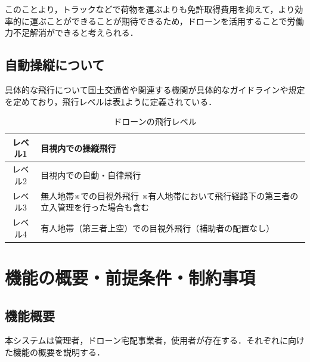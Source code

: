 \documentclass[a4paper, titlepage]{jsarticle}
\begin{document}
このことより，トラックなどで荷物を運ぶよりも免許取得費用を抑えて，より効率的に運ぶことができることが期待できるため，ドローンを活用することで労働力不足解消ができると考えられる．


\subsection{自動操縦について}
具体的な飛行について国土交通省や関連する機関が具体的なガイドラインや規定を定めており，飛行レベルは表\ref{tab:dron_level}ように定義されている．
\begin{table}[htbp]
  \centering
  \label{tab:dron_level}
  \caption{ドローンの飛行レベル}
  \begin{tabular}{|c|l|}
    \hline
    レベル1 & 目視内での操縦飛行 \\ \hline
    レベル2 & 目視内での自動・自律飛行 \\ \hline
    レベル3 & 無人地帯※での目視外飛行
    ※有人地帯において飛行経路下の第三者の立入管理を行った場合も含む   \\ \hline
    レベル4 & 有人地帯（第三者上空）での目視外飛行（補助者の配置なし） \\ \hline
  \end{tabular}
\end{table}



\section{機能の概要・前提条件・制約事項}
\subsection{機能概要}
本システムは管理者，ドローン宅配事業者，使用者が存在する．それぞれに向けた機能の概要を説明する．
\end{document}
